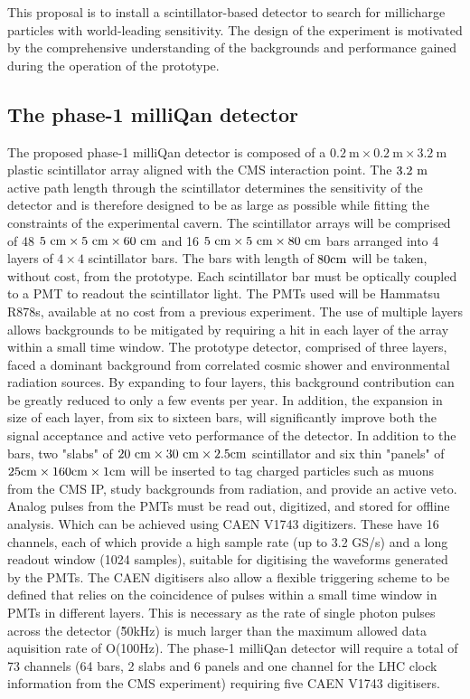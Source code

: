 \documentclass[11pt]{article}
\theoremstyle{plain} \numberwithin{equation}{section}
\theoremstyle{definition}
\begin{document}
This proposal is to install a scintillator-based detector
to search for millicharge particles with world-leading sensitivity.
The design of the experiment is motivated by 
the comprehensive understanding of the backgrounds and performance gained during the
operation of the prototype.

\subsection*{The phase-1 milliQan detector}

The proposed phase-1 milliQan detector is
composed of a $0.2~\mathrm{m}\times0.2~\mathrm{m}\times3.2~\mathrm{m}$ plastic scintillator array aligned with 
the CMS interaction point. The $3.2~\rm{m}$ active path length through the scintillator determines the sensitivity 
of the detector and is therefore designed to be as large as possible while fitting the constraints of the experimental cavern.
The scintillator arrays will be comprised of 48 $5~\rm{cm}\times5~\rm{cm}\times60~\rm{cm}$ 
and 16 $5~\rm{cm}\times5~\rm{cm}\times80~\rm{cm}$ bars arranged into 4 layers of $4\times4$ scintillator bars. 
The bars with length of $80\rm{cm}$ will be taken, without cost, from the prototype. Each scintillator bar must be optically
coupled to a PMT to readout the scintillator light. The PMTs used will be 
Hammatsu R878s, available at no cost from a previous experiment. The use of multiple layers allows backgrounds to be mitigated
by requiring a hit in each layer of the array within a small time window. The prototype detector, comprised
of three layers, faced a dominant background from correlated cosmic shower and environmental radiation sources.
By expanding to four layers, this background contribution can be greatly reduced to only a few events per year.
In addition, the expansion in size of each layer, from six to sixteen bars, will significantly improve
both the signal acceptance and active veto performance of the detector. 
In addition to the bars, two "slabs" of $20~\rm{cm}\times30~\rm{cm}\times2.5\rm{cm}$ scintillator and 
six thin "panels" of $25\rm{cm}\times160\rm{cm}\times1\rm{cm}$ 
will be inserted to tag charged particles such as muons from the CMS IP, study backgrounds from radiation, 
and provide an active veto. Analog pulses from the PMTs must be read out,
digitized, and stored for offline analysis. Which can be achieved using CAEN V1743 digitizers. 
These have 16 channels, each of which provide a high sample rate (up to 3.2 GS/s) and a long readout window (1024 samples), 
suitable for digitising the waveforms generated by the PMTs. The CAEN digitisers also allow a flexible triggering
scheme to be defined that relies on the coincidence of pulses within a small time window in PMTs in different layers. This is necessary
as the rate of single photon pulses across the detector (\~50kHz) is much larger than the maximum allowed data aquisition rate of O(100Hz). 
The phase-1 milliQan detector will require a total of 73 channels (64 bars, 2 slabs and 6 panels and one channel
for the LHC clock information from the CMS experiment) requiring five CAEN V1743 digitisers. 
\end{document}
